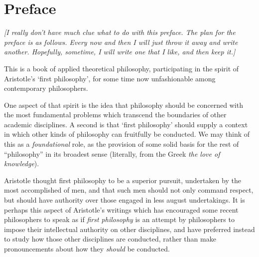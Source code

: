 
\newcommand{\listpositionname}{Positions}
\newlistof[chapter]{position}{pos}{\listpositionname}

\newcommand{\position}[2]{%
\refstepcounter{position}
{\paragraph{\textbf{#1 \theposition}} #2}
\addcontentsline{pos}{position}{\protect\numberline{\theposition} #2}\par}



\chapter*{Preface}\label{Preface}

{\it
[I really don't have much clue what to do with this preface.
The plan for the preface is as follows.
Every now and then I will just throw it away and write another.
Hopefully, sometime, I will write one that I like, and then keep it.]
}%


This is a book of applied theoretical philosophy, participating in the
spirit of Aristotle's `first philosophy', for some time now
unfashionable among contemporary philosophers. 

One aspect of that spirit is the idea that philosophy should be
concerned with the most fundamental problems which transcend the
boundaries of other academic disciplines. 
A second is that `first philosophy' should supply a context in which
other kinds of philosophy can fruitfully be conducted. 
We may think of this as a \emph{foundational} role, as the provision
of some solid basis for the rest of ``philosophy'' in its broadest
sense (literally, from the Greek \emph{the love of knowledge}). 

Aristotle thought first philosophy to be a superior pursuit, undertaken
by the most accomplished of men, and that such men should not only
command respect, but should have authority over those engaged in less
august undertakings.
It is perhaps this aspect of Aristotle's writings which has encouraged
some recent philosophers to speak as if \emph{first philosophy} is an
attempt  by philosophers to impose their intellectual authority on
other disciplines, and have preferred instead to study how those other
disciplines are conducted, rather than make pronouncements about how
they \emph{should} be conducted.

